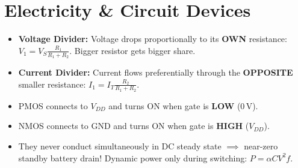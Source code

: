 \section{Electricity \& Circuit Devices}
\begin{trickbox}
\begin{itemize}[leftmargin=*]
    \item \textbf{Voltage Divider:} Voltage drops proportionally to its \textbf{OWN} resistance: $V_1 = V_S \frac{R_1}{R_1+R_2}$. Bigger resistor gets bigger share.
    \item \textbf{Current Divider:} Current flows preferentially through the \textbf{OPPOSITE} smaller resistance: $I_1 = I_T \frac{R_2}{R_1+R_2}$.
\end{itemize}
\end{trickbox}

\begin{notebox}
\begin{itemize}[leftmargin=*]
    \item PMOS connects to $V_{DD}$ and turns ON when gate is \textbf{LOW} ($0\,\text{V}$).
    \item NMOS connects to $\text{GND}$ and turns ON when gate is \textbf{HIGH} ($V_{DD}$).
    \item They never conduct simultaneously in DC steady state $\implies$ near-zero standby battery drain! Dynamic power only during switching: $P = \alpha C V^2 f$.
\end{itemize}
\end{notebox}
